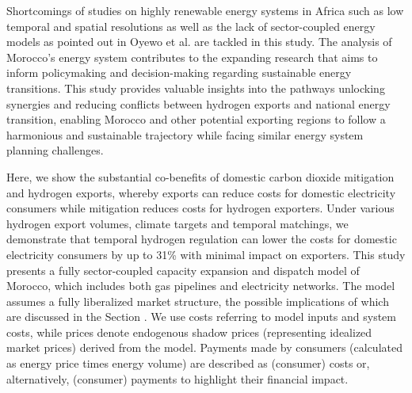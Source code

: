 \documentclass[5p,numafflabel]{elsarticle}
\begin{document}
Shortcomings of studies on highly renewable energy systems in Africa such as low temporal and spatial resolutions as well as the lack of sector-coupled energy models as pointed out in Oyewo et al.\cite{Oyewo2023} are tackled in this study. The analysis of Morocco's energy system contributes to the expanding research that aims to inform policymaking and decision-making regarding sustainable energy transitions. This study provides valuable insights into the pathways unlocking synergies and reducing conflicts between hydrogen exports and national energy transition, enabling Morocco and other potential exporting regions to follow a harmonious and sustainable trajectory while facing similar energy system planning challenges.







Here, we show the substantial co-benefits of domestic carbon dioxide mitigation and hydrogen exports, whereby exports can reduce costs for domestic electricity consumers while mitigation reduces costs for hydrogen exporters.
Under various hydrogen export volumes, climate targets and temporal matchings, we demonstrate 
that temporal hydrogen regulation can lower the costs for domestic electricity consumers by up to 31\% with minimal impact on exporters.
This study presents a fully sector-coupled capacity expansion and dispatch model of Morocco, which includes both gas pipelines and electricity networks. The model assumes a fully liberalized market structure, the possible implications of which are discussed in the Section .
We use costs referring to model inputs and system costs, while prices denote endogenous shadow prices (representing idealized market prices) derived from the model. Payments made by consumers (calculated as energy price times energy volume) are described as (consumer) costs or, alternatively, (consumer) payments to highlight their financial impact.
\end{document}
